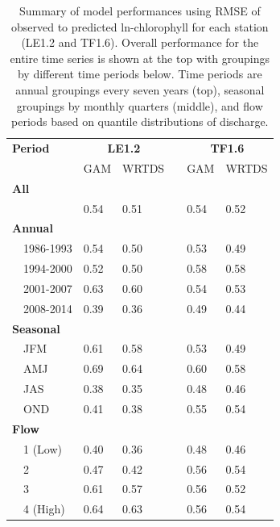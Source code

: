 \documentclass[letterpaper,12pt,oneside]{article}\usepackage[]{graphicx}\usepackage[]{color}
\begin{document}
\begin{table}[!tbp]
\caption{Summary of model performances using \ac{RMSE} of observed to predicted ln-chlorophyll for each station (LE1.2 and TF1.6).  Overall performance for the entire time series is shown at the top with groupings by different time periods below.  Time periods are annual groupings every seven years (top), seasonal groupings by monthly quarters (middle), and flow periods based on quantile distributions of discharge.\label{tab:perftoobs}} 
\begin{center}
\begin{tabular}{lllcll}
\hline\hline
\multicolumn{1}{l}{\bfseries Period}&\multicolumn{2}{c}{\bfseries LE1.2}&\multicolumn{1}{c}{\bfseries }&\multicolumn{2}{c}{\bfseries TF1.6}\tabularnewline
\cline{2-3} \cline{5-6}
\multicolumn{1}{l}{}&\multicolumn{1}{c}{GAM}&\multicolumn{1}{c}{WRTDS}&\multicolumn{1}{c}{}&\multicolumn{1}{c}{GAM}&\multicolumn{1}{c}{WRTDS}\tabularnewline
\hline
{\bfseries All}&&&&&\tabularnewline
~~&0.54&0.51&&0.54&0.52\tabularnewline
\hline
{\bfseries Annual}&&&&&\tabularnewline
~~1986-1993&0.54&0.50&&0.53&0.49\tabularnewline
~~1994-2000&0.52&0.50&&0.58&0.58\tabularnewline
~~2001-2007&0.63&0.60&&0.54&0.53\tabularnewline
~~2008-2014&0.39&0.36&&0.49&0.44\tabularnewline
\hline
{\bfseries Seasonal}&&&&&\tabularnewline
~~JFM&0.61&0.58&&0.53&0.49\tabularnewline
~~AMJ&0.69&0.64&&0.60&0.58\tabularnewline
~~JAS&0.38&0.35&&0.48&0.46\tabularnewline
~~OND&0.41&0.38&&0.55&0.54\tabularnewline
\hline
{\bfseries Flow}&&&&&\tabularnewline
~~1 (Low)&0.40&0.36&&0.48&0.46\tabularnewline
~~2&0.47&0.42&&0.56&0.54\tabularnewline
~~3&0.61&0.57&&0.56&0.52\tabularnewline
~~4 (High)&0.64&0.63&&0.56&0.54\tabularnewline
\hline
\end{tabular}\end{center}

\end{table}
\end{document}

